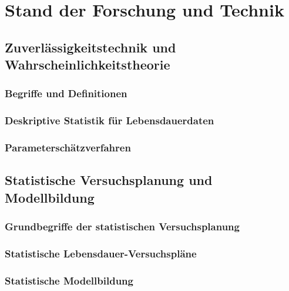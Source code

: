 
\chapter{Stand der Forschung und Technik}


\section{Zuverlässigkeitstechnik und Wahrscheinlichkeitstheorie}
\subsection{Begriffe und Definitionen}
\subsection{Deskriptive Statistik für Lebensdauerdaten}
\subsection{Parameterschätzverfahren}
\section{Statistische Versuchsplanung und Modellbildung}
\subsection{Grundbegriffe der statistischen Versuchsplanung}
\subsection{Statistische Lebensdauer-Versuchspläne}
\subsection{Statistische Modellbildung}
